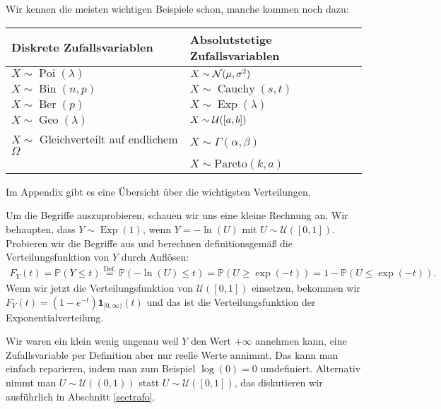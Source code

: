 \begin{beispiel}\label{link}
	Wir kennen die meisten wichtigen Beispiele schon, manche kommen noch dazu:
	\begin{center}
	\begin{tabular}{l|l}
		Diskrete Zufallsvariablen& Absolutstetige Zufallsvariablen\\ %
		\hline
		$X \sim \operatorname{Poi}(\lambda)$& $X \sim \mathcal{N}(\mu, \sigma^2)$\\
		$X \sim \operatorname{Bin}(n,p)$& $X \sim \operatorname{Cauchy}(s,t)$\\ 
		$X \sim \operatorname{Ber}(p)$& $X \sim \operatorname{Exp}(\lambda)$\\
		$X \sim \operatorname{Geo}(\lambda)$& $X \sim \mathcal{U}([a,b])$\\
		$X \sim$ Gleichverteilt auf endlichem $\Omega$ & $X\sim\Gamma(\alpha,\beta)$\\
		&$X\sim \text{Pareto}(k,a)$
	\end{tabular}
	\end{center}
	Im Appendix gibt es eine \"Ubersicht \"uber die wichtigsten Verteilungen.
\end{beispiel}
Um die Begriffe auszuprobieren, schauen wir uns eine kleine Rechnung an. Wir behaupten, dass $Y\sim \operatorname{Exp}(1)$, wenn $Y=-\ln(U)$ mit $U\sim \mathcal U([0,1])$. Probieren wir die Begriffe aus und berechnen definitionsgem\"a\ss{} die Verteilungsfunktion von $Y$ durch Aufl\"osen:
\begin{align*}
	F_Y(t)=\mathbb P(Y\leq t) \overset{\text{Def.}}{=} \mathbb P(-\ln(U)\leq t)=\mathbb P(U\geq \exp(-t))=1-\mathbb P(U\leq \exp(-t)).
\end{align*}
Wenn wir jetzt die Verteilungsfunktion  von $\mathcal U([0,1])$ einsetzen, bekommen wir $F_Y(t)= (1-e^{-t})\mathbf 1_{[0,\infty)}(t)$ und das ist die Verteilungsfunktion der Exponentialverteilung.\smallskip 

 Wir waren ein klein wenig ungenau weil $Y$ den Wert $+\infty$ annehmen kann, eine Zufallsvariable per Definition aber nur reelle Werte annimmt. Das kann man einfach reparieren, indem man zum Beispiel $\log(0)=0$ umdefiniert. Alternativ nimmt man $U\sim \mathcal U((0,1))$ statt $U\sim \mathcal U([0,1])$, das diskutieren wir ausf\"uhrlich in Abschnitt \ref{sectrafo}.\smallskip


